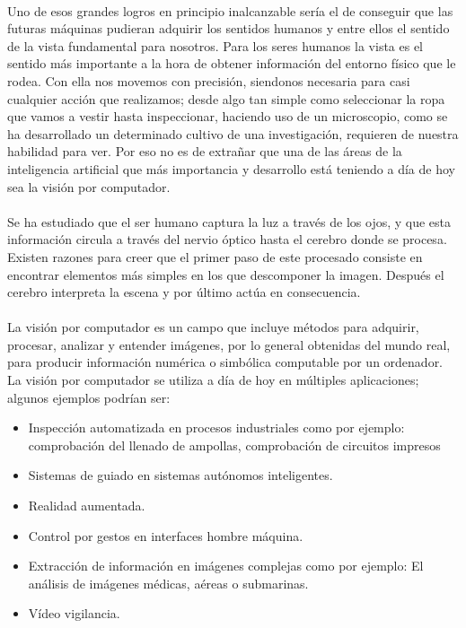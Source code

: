 \documentclass[a4paper,12pt,titlepage,final]{book}
\begin{document}
\paragraph{}
Uno de esos grandes logros en principio inalcanzable sería el de conseguir que las futuras máquinas pudieran adquirir los sentidos humanos y entre ellos el sentido de la vista fundamental para nosotros. Para los seres humanos la vista es el sentido más importante a la hora de obtener información del entorno físico que le rodea. Con ella nos movemos con precisión, siendonos necesaria para casi cualquier acción que realizamos; desde algo tan simple como seleccionar la ropa que vamos a vestir hasta inspeccionar, haciendo uso de un microscopio, como se ha desarrollado un determinado cultivo de una investigación, requieren de nuestra habilidad para ver. Por eso no es de extrañar que una de las áreas de la inteligencia artificial que más importancia y desarrollo está teniendo a día de hoy sea la visión por computador.

\paragraph{}
Se ha estudiado que el ser humano captura la luz a través de los ojos, y que esta información circula a través del nervio óptico hasta el cerebro donde se procesa. Existen razones para creer que el primer paso de este procesado consiste en encontrar elementos más simples en los que descomponer la imagen. Después el cerebro interpreta la escena y por último actúa en consecuencia.

\paragraph{}
La visión por computador es un campo que incluye métodos para adquirir, procesar, analizar y entender imágenes, por lo general obtenidas del mundo real, para producir información numérica o simbólica computable por un ordenador. La visión por computador se utiliza a día de hoy en múltiples aplicaciones; algunos ejemplos podrían ser:

\begin{itemize}
  \item Inspección automatizada en procesos industriales como por ejemplo: comprobación del llenado de ampollas, comprobación de circuitos impresos
  \item Sistemas de guiado en sistemas autónomos inteligentes.
  \item Realidad aumentada.
  \item Control por gestos en interfaces hombre máquina.
  \item Extracción de información en imágenes complejas como por ejemplo: El análisis de imágenes médicas, aéreas o submarinas.
  \item Vídeo vigilancia.
\end{itemize}
\end{document}
